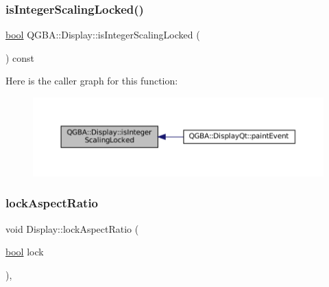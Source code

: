 \subsubsection{\texorpdfstring{is\+Integer\+Scaling\+Locked()}{isIntegerScalingLocked()}}
{\footnotesize\ttfamily \mbox{\hyperlink{libretro_8h_a4a26dcae73fb7e1528214a068aca317e}{bool}} Q\+G\+B\+A\+::\+Display\+::is\+Integer\+Scaling\+Locked (\begin{DoxyParamCaption}{ }\end{DoxyParamCaption}) const\hspace{0.3cm}{\ttfamily [inline]}}

Here is the caller graph for this function\+:
\nopagebreak
\begin{figure}[H]
\begin{center}
\leavevmode
\includegraphics[width=350pt]{class_q_g_b_a_1_1_display_a91092d6e566e11d38500912c09429ae2_icgraph}
\end{center}
\end{figure}
\mbox{\label{class_q_g_b_a_1_1_display_acad5a30d192f9207376208534036bbaa}} 
\subsubsection{\texorpdfstring{lock\+Aspect\+Ratio}{lockAspectRatio}}
{\footnotesize\ttfamily void Display\+::lock\+Aspect\+Ratio (\begin{DoxyParamCaption}\item[{\mbox{\hyperlink{libretro_8h_a4a26dcae73fb7e1528214a068aca317e}{bool}}}]{lock }\end{DoxyParamCaption})\hspace{0.3cm}{\ttfamily [virtual]}, {\ttfamily [slot]}}

